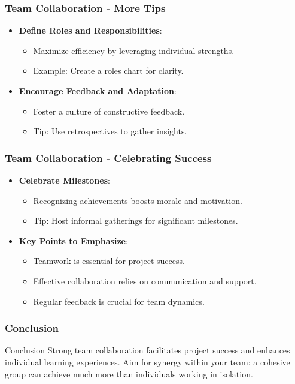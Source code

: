 \documentclass[aspectratio=169]{beamer}
\begin{document}
\begin{frame}[fragile]
    \frametitle{Team Collaboration - More Tips}
    \begin{itemize}
        \item \textbf{Define Roles and Responsibilities}:
            \begin{itemize}
                \item Maximize efficiency by leveraging individual strengths.
                \item Example: Create a roles chart for clarity.
            \end{itemize}
        \item \textbf{Encourage Feedback and Adaptation}:
            \begin{itemize}
                \item Foster a culture of constructive feedback.
                \item Tip: Use retrospectives to gather insights.
            \end{itemize}
    \end{itemize}
\end{frame}

\begin{frame}[fragile]
    \frametitle{Team Collaboration - Celebrating Success}
    \begin{itemize}
        \item \textbf{Celebrate Milestones}:
            \begin{itemize}
                \item Recognizing achievements boosts morale and motivation.
                \item Tip: Host informal gatherings for significant milestones.
            \end{itemize}
        \item \textbf{Key Points to Emphasize}:
            \begin{itemize}
                \item Teamwork is essential for project success.
                \item Effective collaboration relies on communication and support.
                \item Regular feedback is crucial for team dynamics.
            \end{itemize}
    \end{itemize}
\end{frame}

\begin{frame}[fragile]
    \frametitle{Conclusion}
    \begin{block}{Conclusion}
        Strong team collaboration facilitates project success and enhances individual learning experiences. Aim for synergy within your team: a cohesive group can achieve much more than individuals working in isolation.
    \end{block}
\end{frame}
\end{document}
